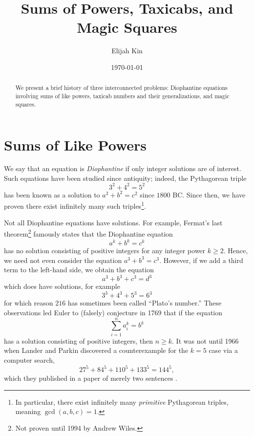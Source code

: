 \documentclass[11pt]{amsart}
\title{Sums of Powers, Taxicabs, and Magic Squares}
\author{Elijah Kin}
\date{\today}
\begin{document}
\begin{abstract}
  We present a brief history of three interconnected problems: Diophantine equations involving sums of like powers, taxicab numbers and their generalizations, and magic squares.
\end{abstract}

\maketitle

\section{Sums of Like Powers}
We say that an equation is \emph{Diophantine} if only integer solutions are of interest. Such equations have been studied since antiquity; indeed, the Pythagorean triple
\begin{equation*}
  3^2 + 4^2 = 5^2
\end{equation*}
has been known as a solution to $a^2 + b^2 = c^2$ since $1800$ BC. Since then, we have proven there exist infinitely many such triples\footnote{In particular, there exist infinitely many \emph{primitive} Pythagorean triples, meaning $\gcd(a, b, c) = 1$.}.

Not all Diophantine equations have solutions. For example, Fermat's last theorem\footnote{Not proven until 1994 by Andrew Wiles.} famously states that the Diophantine equation
\begin{equation*}
  a^k + b^k = c^k
\end{equation*}
has no solution consisting of positive integers for any integer power $k \geq 2$. Hence, we need not even consider the equation $a^3 + b^3 = c^3$. However, if we add a third term to the left-hand side, we obtain the equation
\begin{equation*}
  a^3 + b^3 + c^3 = d^3
\end{equation*}
which does have solutions, for example
\begin{equation*}
  3^3 + 4^3 + 5^3 = 6^3
\end{equation*}
for which reason $216$ has sometimes been called ``Plato's number.'' These observations led Euler to (falsely) conjecture in 1769 that if the equation
\begin{equation*}
  \sum_{i = 1}^n a_i^k = b^k
\end{equation*}
has a solution consisting of positive integers, then $n \geq k$. It was not until 1966 when Lander and Parkin discovered a counterexample for the $k = 5$ case via a computer search,
\begin{equation*}
  27^5 + 84^5 + 110^5 + 133^5 = 144^5,
\end{equation*}
which they published in a paper of merely two sentences \cite{LP66}.
\end{document}
